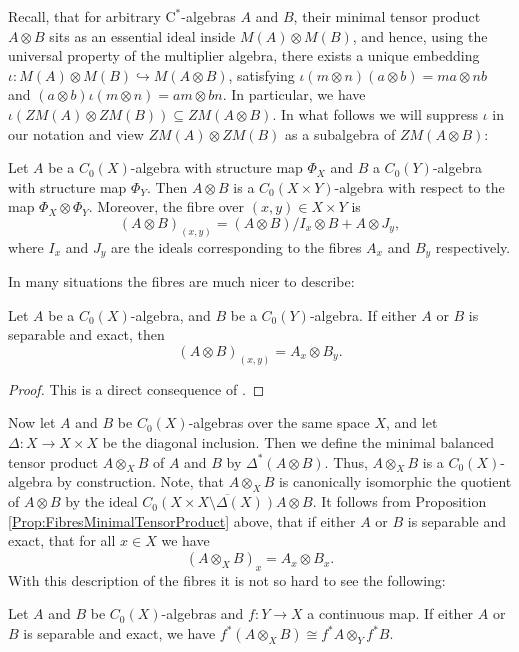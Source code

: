 	Recall, that for arbitrary $\mathrm{C}^*$-algebras $A$ and $B$, their minimal tensor product $A\otimes B$ sits as an essential ideal inside $M(A)\otimes M(B)$, and hence, using the universal property of the multiplier algebra, there exists a unique embedding $\iota: M(A)\otimes M(B)\hookrightarrow M(A\otimes B)$, satisfying $\iota(m\otimes n)(a\otimes b)=ma\otimes nb$ and $(a\otimes b)\iota(m\otimes n)=am\otimes bn$. In particular, we have $\iota(ZM(A)\otimes ZM(B))\subseteq ZM(A\otimes B)$. In what follows we will suppress $\iota$ in our notation and view $ZM(A)\otimes ZM(B)$ as a subalgebra of $ZM(A\otimes B)$:
	\begin{prop}\cite[Proposition~3.4]{MR3549520}
		Let $A$ be a $C_0(X)$-algebra with structure map $\Phi_X$ and $B$ a $C_0(Y)$-algebra with structure map $\Phi_Y$. Then $A\otimes B$ is a $C_0(X\times Y)$-algebra with respect to the map $\Phi_X\otimes \Phi_Y$. Moreover, the fibre over $(x,y)\in X\times Y$ is $$(A\otimes B)_{(x,y)}=(A\otimes B)/I_x\otimes B+A\otimes J_y,$$ where $I_x$ and $J_y$ are the ideals corresponding to the fibres $A_x$ and $B_y$ respectively.
	\end{prop}
	In many situations the fibres are much nicer to describe:
	\begin{prop}\label{Prop:FibresMinimalTensorProduct}
		Let $A$ be a $C_0(X)$-algebra, and $B$ be a $C_0(Y)$-algebra. If either $A$ or $B$ is separable and exact, then $$(A\otimes B)_{(x,y)}=A_x\otimes B_y.$$
	\end{prop}
	\begin{proof}
		This is a direct consequence of \cite[IV.3.4.22, Proposition~IV.3.4.23]{MR2188261}.
	\end{proof}
	Now let $A$ and $B$ be $C_0(X)$-algebras over the same space $X$, and let $\Delta:X\rightarrow X\times X$ be the diagonal inclusion. Then we define the minimal balanced tensor product $A\otimes_X B$ of $A$ and $B$ by $\Delta^*(A\otimes B)$. Thus, $A\otimes_X B$ is a $C_0(X)$-algebra by construction. Note, that $A\otimes_X B$ is canonically isomorphic the quotient of $A\otimes B$ by the ideal $\overline{C_0(X\times X\setminus \Delta(X))A\otimes B}$.
	It follows from Proposition \ref{Prop:FibresMinimalTensorProduct} above, that if either $A$ or $B$ is separable and exact, that for all $x\in X$ we have
	$$(A\otimes_X B)_x=A_x\otimes B_x.$$
	With this description of the fibres it is not so hard to see the following:
	\begin{lemma}
		Let $A$ and $B$ be $C_0(X)$-algebras and $f:Y\rightarrow X$ a continuous map. If either $A$ or $B$ is separable and exact, we have $f^*(A\otimes_X B)\cong f^*A\otimes_Y f^*B$.
	\end{lemma}
